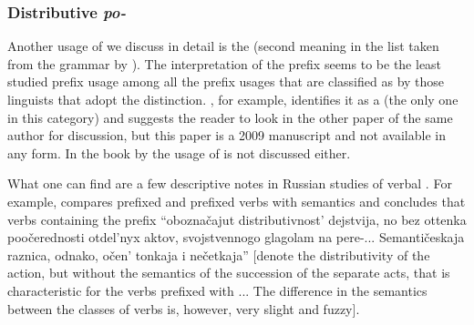 
\subsubsection{Distributive \textit{po-}}

Another usage of  we discuss in detail is the  (second meaning in the list taken from the grammar by \citealt{Shvedova:82}). The  interpretation of the prefix  seems to be the least studied prefix usage among all the prefix usages that are classified as  by those linguists that adopt the distinction. \citet{Tatevosov:09}, for example, identifies it as a  (the only one in this category) and suggests the reader to look in the other paper of the same author for discussion, but this paper is a 2009 manuscript and not available in any form. In the book by \citet{Kagan:book} the  usage of  is not discussed either. 

What one can find are a few descriptive notes in Russian studies of verbal . For example, \citet[289--290]{Isachenko:60} compares prefixed and prefixed verbs with  semantics and concludes that  verbs containing the prefix  ``obozna\v{c}ajut distributivnost' dejstvija, no bez ottenka poo\v{c}erednosti otdel'nyx aktov, svojstvennogo glagolam na pere-... Semanti\v{c}eskaja raznica, odnako, o\v{c}en' tonkaja i ne\v{c}etkaja'' [denote the distributivity of the action, but without the semantics of the succession of the separate acts, that is characteristic for the verbs prefixed with ... The difference in the semantics between the classes of verbs is, however, very slight and fuzzy].

